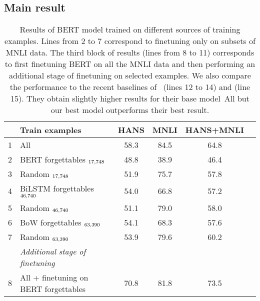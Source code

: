 
\subsection{Main result}

\begin{table*}[ht]
\caption{Results of BERT model trained on different sources of training examples. 
Lines from 2 to 7 correspond to finetuning only on subsets of MNLI data. The third block of results (lines from 8 to 11) corresponds to first finetuning BERT on all the MNLI data and then performing an additional stage of finetuning on selected examples. We also compare the performance to the recent baselines of~\cite{clark2019dont} (lines 12 to 14) and \cite{mahabadi2019simple} (line 15). They obtain slightly higher results for their base model~\textrm{All} but our best model outperforms their best result.}
\small
\label{tab:twoclass}
\centering
\begin{tabular}{llcccc}
\toprule
& Train examples & HANS & MNLI & HANS+MNLI  \\
\midrule
\small{1} & All & 58.3 & 84.5 & 64.8        \\
\midrule
\small{2} & BERT forgettables $_{17,748}$   & 48.8                     & 38.9                         & 46.4\\
\small{3} & \hspace{0.1cm} Random $_{17,748}$ & 51.9                   & 75.7                         & 57.8\\
\small{4} & BiLSTM forgettables $_{46,740}$ & 54.0                     & 66.8                         & 57.2 \\
\small{5} & \hspace{0.1cm} Random $_{46,740}$ & 51.1                   & 79.0                         & 58.0\\
\small{6} & BoW forgettables $_{63,390}$    & 54.1                     & 68.3                         & 57.6 \\
\small{7} & \hspace{0.1cm} Random $_{63,390}$ & 53.9                   & 79.6                         & 60.2\\
\midrule
&\emph{Additional stage of finetuning} \\
\small{8} & All + finetuning on BERT forgettables   & 70.8                     & 81.8                         & 73.5  \\

\end{tabular}
\end{table*}
